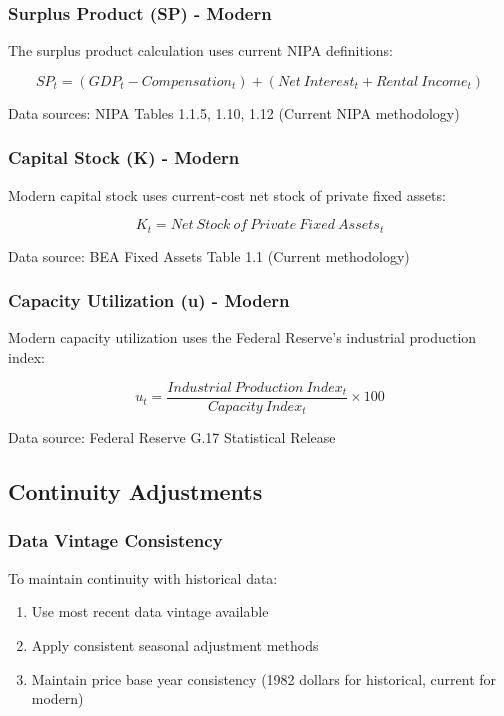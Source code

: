 \documentclass[12pt,a4paper]{article}
\begin{document}
\subsubsection{Surplus Product (SP) - Modern}
The surplus product calculation uses current NIPA definitions:

\begin{equation}
SP_t = (GDP_t - Compensation_t) + (Net\ Interest_t + Rental\ Income_t)
\label{eq:modern_sp}
\end{equation}

Data sources: NIPA Tables 1.1.5, 1.10, 1.12 (Current NIPA methodology)

\subsubsection{Capital Stock (K) - Modern}
Modern capital stock uses current-cost net stock of private fixed assets:

\begin{equation}
K_t = Net\ Stock\ of\ Private\ Fixed\ Assets_t
\label{eq:modern_capital}
\end{equation}

Data source: BEA Fixed Assets Table 1.1 (Current methodology)

\subsubsection{Capacity Utilization (u) - Modern}
Modern capacity utilization uses the Federal Reserve's industrial production index:

\begin{equation}
u_t = \frac{Industrial\ Production\ Index_t}{Capacity\ Index_t} \times 100
\label{eq:modern_utilization}
\end{equation}

Data source: Federal Reserve G.17 Statistical Release

\subsection{Continuity Adjustments}

\subsubsection{Data Vintage Consistency}
To maintain continuity with historical data:

\begin{enumerate}
    \item Use most recent data vintage available
    \item Apply consistent seasonal adjustment methods
    \item Maintain price base year consistency (1982 dollars for historical, current for modern)
\end{enumerate}
\end{document}
